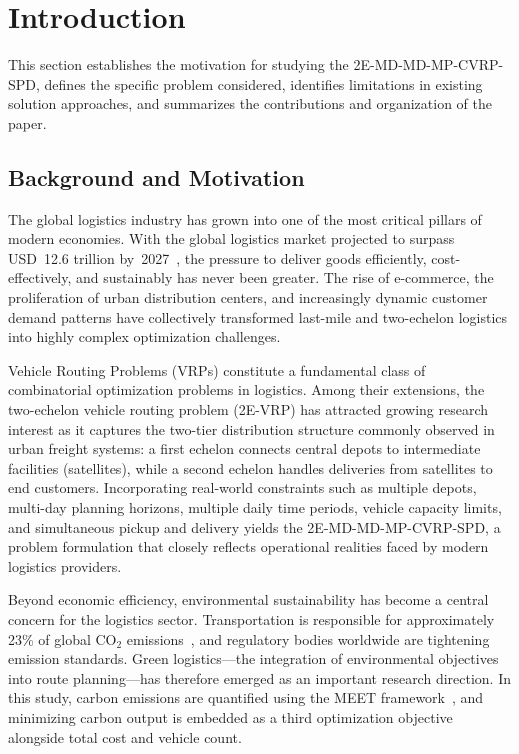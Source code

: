 \documentclass[11pt, a4paper]{article}
\numberwithin{equation}{section}
\begin{document}
\section{Introduction}
\label{sec:intro}

This section establishes the motivation for studying the 2E-MD-MD-MP-CVRP-SPD,
defines the specific problem considered, identifies limitations in existing
solution approaches, and summarizes the contributions and organization of
the paper.

\subsection{Background and Motivation}

The global logistics industry has grown into one of the most critical pillars
of modern economies.  With the global logistics market projected to surpass
USD~12.6 trillion by~2027~\cite{grandview2020}, the pressure to deliver goods
efficiently, cost-effectively, and sustainably has never been greater.  The
rise of e-commerce, the proliferation of urban distribution centers, and
increasingly dynamic customer demand patterns have collectively transformed
last-mile and two-echelon logistics into highly complex optimization challenges.

Vehicle Routing Problems (VRPs) constitute a fundamental class of combinatorial
optimization problems in logistics.  Among their extensions, the two-echelon
vehicle routing problem (2E-VRP) has attracted growing research interest as it
captures the two-tier distribution structure commonly observed in urban freight
systems: a first echelon connects central depots to intermediate facilities
(satellites), while a second echelon handles deliveries from satellites to end
customers.  Incorporating real-world constraints such as multiple depots,
multi-day planning horizons, multiple daily time periods, vehicle capacity
limits, and simultaneous pickup and delivery yields the
2E-MD-MD-MP-CVRP-SPD, a problem formulation that closely reflects operational
realities faced by modern logistics providers.

Beyond economic efficiency, environmental sustainability has become a central
concern for the logistics sector.  Transportation is responsible for
approximately 23\% of global CO$_2$ emissions~\cite{iea2022}, and regulatory
bodies worldwide are tightening emission standards.  Green logistics---the
integration of environmental objectives into route planning---has therefore
emerged as an important research direction.  In this study, carbon emissions
are quantified using the MEET framework~\cite{hickman1999}, and minimizing
carbon output is embedded as a third optimization objective alongside total
cost and vehicle count.
\end{document}
